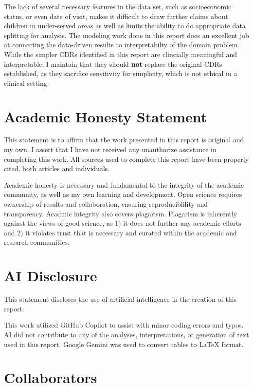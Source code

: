 \documentclass[10pt,letterpaper]{article}
\begin{document}
The lack of several necessary features in the data set, such as socioeconomic status, or even date of visit, makes it difficult to draw further claims about children in under-served areas as well as limits the ability to do appropriate data splitting for analysis. The modeling work done in this report does an excellent job at connecting the data-driven results to interpretabilty of the domain problem. While the simpler CDRs identified in this report are clincially meaningful and interpretable, I maintain that they should \textbf{not} replace the original CDRs established, as they sacrifice sensitivity for simplicity, which is not ethical in a clinical setting.

\section{Academic Honesty Statement}\label{academic-honesty-statement}

This statement is to affirm that the work presented in this report is original and my own. I assert that I have not received any unauthorize assistance in completing this work. All sources used to complete this report have been properly cited, both articles and individuals.

Academic honesty is  necessary and fundamental to the integrity of the academic community, as well as my own learning and development. Open science requires ownership of results and collaboration, ensuring reproduciblility and transparency. Acadmic integrity also covers plagarism. Plagarism is inherently against the views of good science, as 1$)$ it does not further any academic efforts and 2$)$ it violates trust that is necessary and curated within the academic and research communities.

\section{AI Disclosure}\label{ai-disclosure}

This statement discloses the use of artificial intelligence in the creation of this report:


This work utilized GitHub Copilot to assist with minor coding errors and typos. AI did not contribute to any of the analyses, interpretations, or generation of text used in this report. Google Gemini was used to convert tables to LaTeX format.

\section{Collaborators}\label{collaborators}
\end{document}
